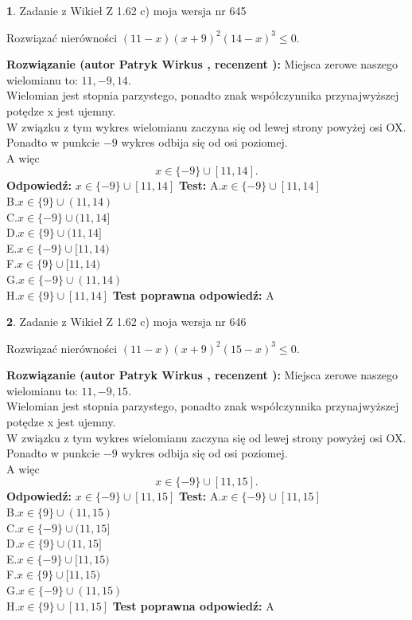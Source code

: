 \documentclass[12pt, a4paper]{article}
\theoremstyle{definition} %
\newtheorem{zad}{}
\newcommand{\zadStart}[1]{\begin{zad}#1\newline}
\newcommand{\zadStop}{\end{zad}}
\newcommand{\rozwStart}[2]{\noindent \textbf{Rozwiązanie (autor #1 , recenzent #2): }\newline}
\newcommand{\rozwStop}{\newline}
\newcommand{\odpStart}{\noindent \textbf{Odpowiedź:}\newline}
\newcommand{\odpStop}{\newline}
\newcommand{\testStart}{\noindent \textbf{Test:}\newline}
\newcommand{\testStop}{\newline}
\newcommand{\kluczStart}{\noindent \textbf{Test poprawna odpowiedź:}\newline}
\newcommand{\kluczStop}{\newline}
\begin{document}
\zadStart{Zadanie z Wikieł Z 1.62 c) moja wersja nr 645}

Rozwiązać nierówności $(11-x)(x+9)^{2}(14-x)^{3}\le0$.
\zadStop
\rozwStart{Patryk Wirkus}{}
Miejsca zerowe naszego wielomianu to: $11, -9, 14$.\\
Wielomian jest stopnia parzystego, ponadto znak współczynnika przy\linebreak najwyższej potędze x jest ujemny.\\ W związku z tym wykres wielomianu zaczyna się od lewej strony powyżej osi OX.\\
Ponadto w punkcie $-9$ wykres odbija się od osi poziomej.\\
A więc $$x \in \{-9\} \cup [11,14].$$
\rozwStop
\odpStart
$x \in \{-9\} \cup [11,14]$
\odpStop
\testStart
A.$x \in \{-9\} \cup [11,14]$\\
B.$x \in \{9\} \cup (11,14)$\\
C.$x \in \{-9\} \cup (11,14]$\\
D.$x \in \{9\} \cup (11,14]$\\
E.$x \in \{-9\} \cup [11,14)$\\
F.$x \in \{9\} \cup [11,14)$\\
G.$x \in \{-9\} \cup (11,14)$\\
H.$x \in \{9\} \cup [11,14]$
\testStop
\kluczStart
A
\kluczStop



\zadStart{Zadanie z Wikieł Z 1.62 c) moja wersja nr 646}

Rozwiązać nierówności $(11-x)(x+9)^{2}(15-x)^{3}\le0$.
\zadStop
\rozwStart{Patryk Wirkus}{}
Miejsca zerowe naszego wielomianu to: $11, -9, 15$.\\
Wielomian jest stopnia parzystego, ponadto znak współczynnika przy\linebreak najwyższej potędze x jest ujemny.\\ W związku z tym wykres wielomianu zaczyna się od lewej strony powyżej osi OX.\\
Ponadto w punkcie $-9$ wykres odbija się od osi poziomej.\\
A więc $$x \in \{-9\} \cup [11,15].$$
\rozwStop
\odpStart
$x \in \{-9\} \cup [11,15]$
\odpStop
\testStart
A.$x \in \{-9\} \cup [11,15]$\\
B.$x \in \{9\} \cup (11,15)$\\
C.$x \in \{-9\} \cup (11,15]$\\
D.$x \in \{9\} \cup (11,15]$\\
E.$x \in \{-9\} \cup [11,15)$\\
F.$x \in \{9\} \cup [11,15)$\\
G.$x \in \{-9\} \cup (11,15)$\\
H.$x \in \{9\} \cup [11,15]$
\testStop
\kluczStart
A
\kluczStop
\end{document}
